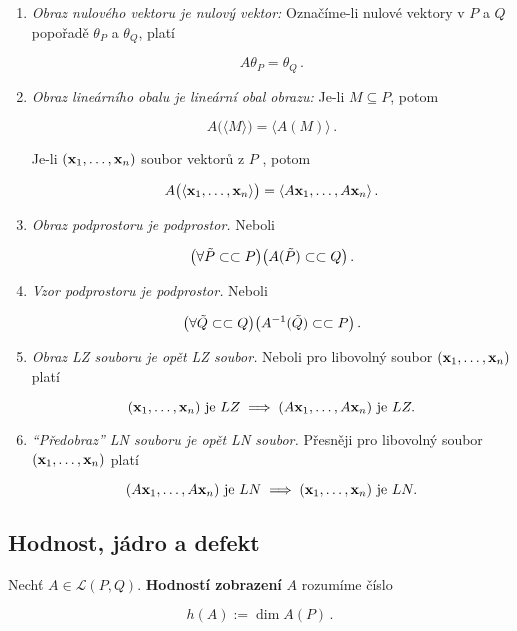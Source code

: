 \begin{enumerate}
    \item \emph{Obraz nulového vektoru je nulový vektor:}  Označíme-li nulové vektory v $P$ a $Q$ popořadě $\theta_P$ a $\theta_Q$, platí

          \[ A\theta_P=\theta_Q\,. \]

    \item \emph{Obraz lineárního obalu je lineární obal obrazu:} Je-li $M\subseteq P$, potom

          \[ A\big(\langle M\rangle \big)=\big\langle A(M)\big\rangle \,. \]

          Je-li $(\mathbf{x}_1,\dots,\mathbf{x}_n)$ soubor vektorů z $P$ , potom

          \[ A\big(\langle \mathbf{x}_1,\dots,\mathbf{x}_n\rangle \big)=\langle A\mathbf{x}_1,\dots,A\mathbf{x}_n\rangle \,. \]

    \item \emph{Obraz podprostoru je podprostor.} Neboli

          \[ \big(\forall \tilde{P}\subset \subset P\big) \big(A(\tilde{P})\subset \subset Q\big)\,. \]

    \item \emph{Vzor podprostoru je podprostor.} Neboli

          \[ \big(\forall \tilde{Q}\subset \subset Q\big) \big(A^{-1}(\tilde{Q})\subset \subset P\big)\,. \]

    \item \emph{Obraz LZ souboru je opět LZ soubor.} Neboli pro libovolný soubor $(\mathbf{x}_1,\dots,\mathbf{x}_n)$ platí

          \[ (\mathbf{x}_1,\dots,\mathbf{x}_n)\text{ je } LZ \implies (A\mathbf{x}_1,\dots,A\mathbf{x}_n)\text{ je } LZ. \]

    \item \emph{``Předobraz'' LN souboru je opět LN soubor.} Přesněji pro libovolný soubor $(\mathbf{x}_1,\dots,\mathbf{x}_n)$ platí

          \[ (A\mathbf{x}_1,\dots,A\mathbf{x}_n)\text{ je } LN \implies (\mathbf{x}_1,\dots,\mathbf{x}_n)\text{ je } LN. \]

\end{enumerate}

\subsection*{Hodnost, jádro a defekt}

Nechť $A\in\mathcal L(P,Q)$. \textbf{Hodností zobrazení} $A$ rozumíme číslo

\[ h(A):=\dim A(P)\,. \]

